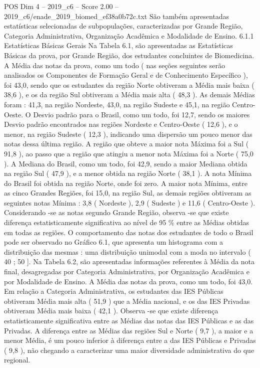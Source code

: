 \begin{textsample}{POS Dim 4 – 2019\_c6 – Score 2.00 – 2019\_c6/enade\_2019\_biomed\_ef38a0b72c.txt}
São também apresentadas estatísticas selecionadas de subpopulações, caracterizadas por Grande Região, Categoria Administrativa, Organização Acadêmica e Modalidade de Ensino. 6.1.1 Estatísticas Básicas Gerais Na Tabela 6.1, são apresentadas as Estatísticas Básicas da prova, por Grande Região, dos estudantes concluintes de Biomedicina.
A Média das notas da prova, como um todo ( nas seções seguintes serão analisados os Componentes de Formação Geral e de Conhecimento Específico ), foi 43,0, sendo que os estudantes da região Norte obtiveram a Média mais baixa ( 38,6 ), e os da região Sul obtiveram a Média mais alta ( 48,3 ).
As demais Médias foram : 41,3, na região Nordeste, 43,0, na região Sudeste e 45,1, na região Centro-Oeste.
O Desvio padrão para o Brasil, como um todo, foi 12,7, sendo os maiores Desvio padrão encontrados nas regiões Nordeste e Centro-Oeste ( 12,6 ), e o menor, na região Sudeste ( 12,3 ), indicando uma dispersão um pouco menor das notas dessa última região.
A região que obteve a maior nota Máxima foi a Sul ( 91,8 ), ao passo que a região que atingiu a menor nota Máxima foi a Norte ( 75,0 ).
A Mediana do Brasil, como um todo, foi 42,9, sendo a maior Mediana obtida na região Sul ( 47,9 ), e a menor obtida na região Norte ( 38,1 ).
A nota Mínima do Brasil foi obtida na região Norte, onde foi zero.
A maior nota Mínima, entre as cinco Grandes Regiões, foi 15,0, na região Sul, as demais regiões obtiveram as seguintes notas Mínima : 3,8 ( Nordeste ), 2,9 ( Sudeste ) e 11,6 ( Centro-Oeste ).
Considerando -se as notas segundo Grande Região, observa -se que existe diferença estatisticamente significativa ao nível de 95 \% entre as Médias obtidas em todas as regiões.
O comportamento das notas dos estudantes de todo o Brasil pode ser observado no Gráfico 6.1, que apresenta um histograma com a distribuição das mesmas : uma distribuição unimodal com a moda no intervalo ( 40 ; 50 ].
Na Tabela 6.2, são apresentadas informações referentes à Média da nota final, desagregadas por Categoria Administrativa, por Organização Acadêmica e por Modalidade de Ensino.
A Média das notas da prova, como um todo, foi 43,0.
Em relação a Categoria Administrativa, os estudantes das IES Públicas obtiveram Média mais alta ( 51,9 ) que a Média nacional, e os das IES Privadas obtiveram Média mais baixa ( 42,1 ).
Observa -se que existe diferença estatisticamente significativa entre as Médias das notas das IES Públicas e as das Privadas.
A diferença entre as Médias das regiões Sul e Norte ( 9,7 ), a maior e a menor Média, é um pouco inferior à diferença entre a das IES Públicas e Privadas ( 9,8 ), não chegando a caracterizar uma maior diversidade administrativa do que regional.

\end{textsample}
